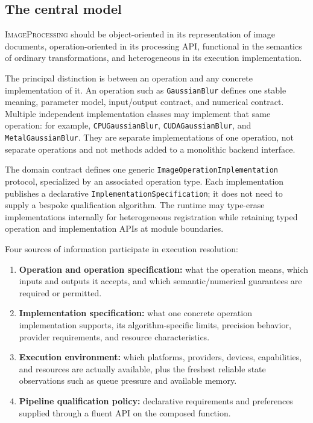 \documentclass[11pt,a4paper,oneside]{article}
\newcommand{\Project}{\textsc{ImageProcessing}}
\begin{document}
\subsection{The central model}

\Project{} should be object-oriented in its representation of image documents, operation-oriented in its processing API, functional in the semantics of ordinary transformations, and heterogeneous in its execution implementation.

The principal distinction is between an operation and any concrete implementation of it. An operation such as \texttt{GaussianBlur} defines one stable meaning, parameter model, input/output contract, and numerical contract. Multiple independent implementation classes may implement that same operation: for example, \texttt{CPUGaussianBlur}, \texttt{CUDAGaussianBlur}, and \texttt{MetalGaussianBlur}. They are separate implementations of one operation, not separate operations and not methods added to a monolithic backend interface.

The domain contract defines one generic \texttt{ImageOperationImplementation} protocol, specialized by an associated operation type. Each implementation publishes a declarative \texttt{ImplementationSpecification}; it does not need to supply a bespoke qualification algorithm. The runtime may type-erase implementations internally for heterogeneous registration while retaining typed operation and implementation APIs at module boundaries.

Four sources of information participate in execution resolution:
\begin{enumerate}
  \item \textbf{Operation and operation specification:} what the operation means, which inputs and outputs it accepts, and which semantic/numerical guarantees are required or permitted.
  \item \textbf{Implementation specification:} what one concrete operation implementation supports, its algorithm-specific limits, precision behavior, provider requirements, and resource characteristics.
  \item \textbf{Execution environment:} which platforms, providers, devices, capabilities, and resources are actually available, plus the freshest reliable state observations such as queue pressure and available memory.
  \item \textbf{Pipeline qualification policy:} declarative requirements and preferences supplied through a fluent API on the composed function.
\end{enumerate}
\end{document}
